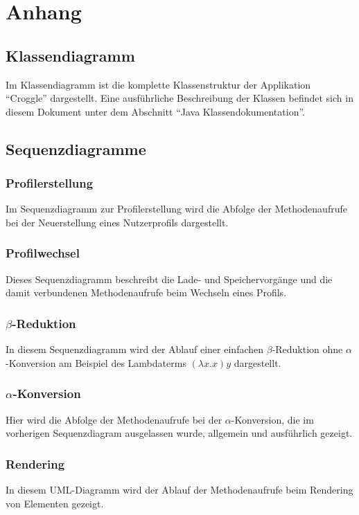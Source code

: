 \chapter{Anhang}
\section{Klassendiagramm}
	Im Klassendiagramm ist die komplette Klassenstruktur der Applikation "`Croggle"' dargestellt. 
	Eine ausführliche Beschreibung der Klassen befindet sich in diesem Dokument unter dem Abschnitt "`Java Klassendokumentation"'. 

\section{Sequenzdiagramme}
	\subsection{Profilerstellung}
		Im Sequenzdiagramm zur Profilerstellung wird die Abfolge der Methodenaufrufe bei der Neuerstellung eines Nutzerprofils dargestellt.

	\subsection{Profilwechsel}
		Dieses Sequenzdiagramm beschreibt die Lade- und Speichervorgänge und die damit verbundenen Methodenaufrufe beim Wechseln eines Profils. 

	\subsection{\(\beta\)-Reduktion}
		In diesem Sequenzdiagramm wird der Ablauf einer einfachen \(\beta\)-Reduktion ohne \(\alpha\)-Konversion am Beispiel des Lambdaterms \((\lambda x.x) y\) dargestellt.

	\subsection{\(\alpha\)-Konversion}
		Hier wird die Abfolge der Methodenaufrufe bei der \(\alpha\)-Konversion, die im vorherigen Sequenzdiagram ausgelassen wurde, allgemein und ausführlich gezeigt.  

	\subsection{Rendering}
		In diesem UML-Diagramm wird der Ablauf der Methodenaufrufe beim Rendering von Elementen gezeigt.
